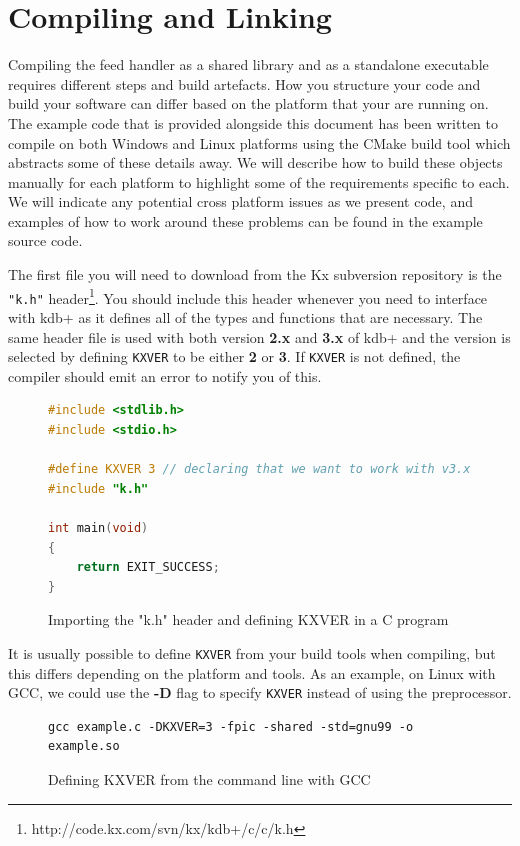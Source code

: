 \chapter{Compiling and Linking}

Compiling the feed handler as a shared library and as a standalone executable requires different
steps and build artefacts. How you structure your code and build your software can differ based
on the platform that your are running on. The example code that is provided alongside this document
has been written to compile on both Windows and Linux platforms using the CMake build tool which
abstracts some of these details away. We will describe how to build these objects manually for
each platform to highlight some of the requirements specific to each. We will indicate any potential
cross platform issues as we present code, and examples of how to work around these problems can be
found in the example source code.

The first file you will need to download from the Kx subversion repository is the \verb|"k.h"| header\footnote{http://code.kx.com/svn/kx/kdb+/c/c/k.h}. You should include this header whenever you
need to interface with kdb+ as it defines all of the types and functions that are necessary. The same
header file is used with both version \textbf{2.x} and \textbf{3.x} of kdb+ and the version is selected
by defining \verb|KXVER| to be either \textbf{2} or \textbf{3}. If \verb|KXVER| is not defined, the
compiler should emit an error to notify you of this.

\begin{figure}[h]
\begin{lstlisting}[language=C]
#include <stdlib.h>
#include <stdio.h>

#define KXVER 3 // declaring that we want to work with v3.x of kdb+
#include "k.h"

int main(void)
{
	return EXIT_SUCCESS;
}
\end{lstlisting}
\caption{Importing the "k.h" header and defining KXVER in a C program}
\end{figure}

It is usually possible to define \verb|KXVER| from your build tools when compiling, but this differs
depending on the platform and tools. As an example, on Linux with GCC, we could use the \textbf{-D} flag
to specify \verb|KXVER| instead of using the preprocessor.

\begin{figure}[h]
\begin{lstlisting}
gcc example.c -DKXVER=3 -fpic -shared -std=gnu99 -o example.so
\end{lstlisting}
\caption{Defining KXVER from the command line with GCC}
\end{figure}


